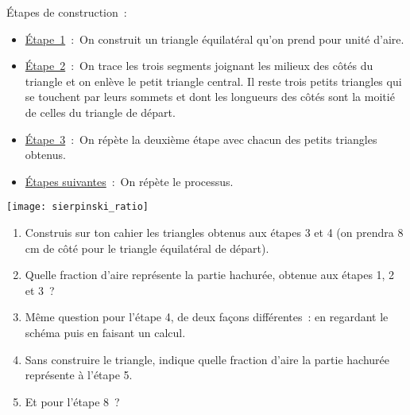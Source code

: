 \begin{exercice}
Étapes de construction :
\begin{itemize}
 \item \underline{Étape 1} : On construit un triangle équilatéral qu'on prend pour unité d'aire.
 \item \underline{Étape 2} : On trace les trois segments joignant les milieux des côtés du triangle et on enlève le petit triangle central. Il reste trois petits triangles qui se touchent par leurs sommets et dont les longueurs des côtés sont la moitié de celles du triangle de départ.
 \item \underline{Étape 3} : On répète la deuxième étape avec chacun des petits triangles obtenus.
 \item \underline{Étapes suivantes} : On répète le processus.
 \end{itemize}
\begin{center} \texttt{[image: sierpinski\_ratio]} \end{center}
\begin{enumerate}
 \item Construis sur ton cahier les triangles obtenus aux étapes 3 et 4 (on prendra 8 cm de côté pour le triangle équilatéral de départ).
 \item Quelle fraction d'aire représente la partie hachurée, obtenue aux étapes 1, 2 et 3 ?
 \item Même question pour l'étape 4, de deux façons différentes : en regardant le schéma puis en faisant un calcul.
 \item Sans construire le triangle, indique quelle fraction d'aire la partie hachurée représente à l'étape 5.
 \item Et pour l'étape 8 ?
 \end{enumerate}
\end{exercice}


